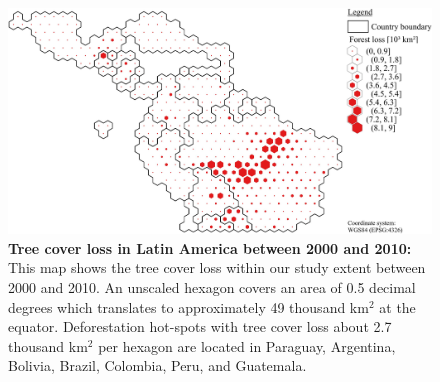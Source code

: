 			\begin{figure}[ht]
				\centering
				\includegraphics[scale=1.]{img/americas_loss_frameless}
				\caption[Tree cover loss in Latin America between 2000 and 2010]{\textbf{Tree cover loss in Latin America between 2000 and 2010:} This map shows the tree cover loss within our study extent between 2000 and 2010. An unscaled hexagon covers an area of 0.5 decimal degrees which translates to approximately 49 thousand km$^2$ at the equator. Deforestation hot-spots with tree cover loss about 2.7 thousand km$^2$ per hexagon are located in Paraguay, Argentina, Bolivia, Brazil, Colombia, Peru, and Guatemala.}
				\label{fig:americas_loss}
			\end{figure}

